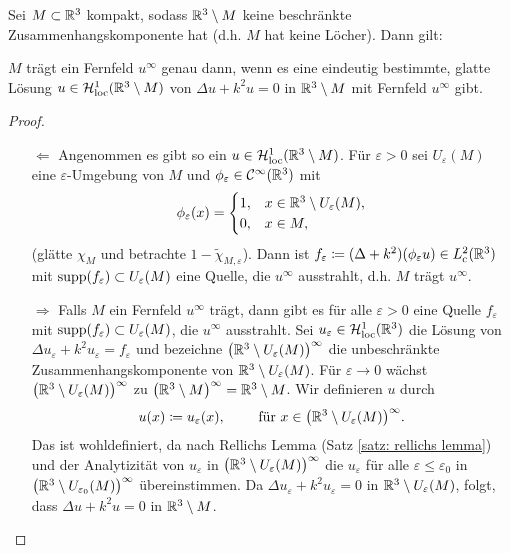 \begin{lem}\label{lem: M trägt fernfeld gdw es ex eind glatte lsg von HG in M^c}
	Sei \(M\subset\mathbb{R}^3\) kompakt, sodass \(\mathbb{R}^3\setminus M\) keine beschränkte Zusammenhangskomponente hat (d.h. \(M\) hat keine Löcher). Dann gilt:\vspace{1mm}
	
	\(M\) trägt ein Fernfeld \(u^\infty\) genau dann, wenn es eine eindeutig bestimmte, glatte Lösung \(u\in\mathcal{H}_{\mathrm{loc}}^1(\mathbb{R}^3\setminus M)\) von \(\Delta u+k^2u=0\) in \(\mathbb{R}^3\setminus M\) mit Fernfeld \(u^\infty\) gibt.
\end{lem}
\begin{proof}\
	\begin{enumerate}
		\item[\glqq{}\(\Leftarrow\)\grqq{}] Angenommen es gibt so ein \(u\in\mathcal{H}_{\mathrm{loc}}^1(\mathbb{R}^3\setminus M)\). Für \(\varepsilon>0\) sei \(U_\varepsilon(M)\) eine \(\varepsilon\)-Umgebung von \(M\) und \(\phi_\varepsilon\in\mathcal{C}^\infty(\mathbb{R}^3)\) mit 
		\begin{equation*}
			\phi_\varepsilon(x)=
			\begin{cases}
				1,&x\in\mathbb{R}^3\setminus U_\varepsilon(M),\\
				0,&x\in M,
			\end{cases}
		\end{equation*}
		(glätte \(\chi_M\) und betrachte \(1-\widetilde{\chi}_{M,\varepsilon}\)). Dann ist \(f_\varepsilon\coloneqq(\Delta+k^2)(\phi_\varepsilon u)\in L_{\mathrm{c}}^2(\mathbb{R}^3)\) mit \(\operatorname{supp}(f_\varepsilon)\subset U_\varepsilon(M)\) eine Quelle, die \(u^\infty\) ausstrahlt, d.h. \(M\) trägt \(u^\infty\).
		\item[\glqq{}\(\Rightarrow\)\grqq{}] Falls \(M\) ein Fernfeld \(u^\infty\) trägt, dann gibt es für alle \(\varepsilon>0\) eine Quelle \(f_\varepsilon\) mit \(\operatorname{supp}(f_\varepsilon)\subset U_\varepsilon(M)\), die \(u^\infty\) ausstrahlt. Sei \(u_\varepsilon\in\mathcal{H}_{\mathrm{loc}}^1(\mathbb{R}^3)\) die Lösung von \(\Delta u_\varepsilon+k^2u_\varepsilon=f_\varepsilon\) und bezeichne \(\big(\mathbb{R}^3\setminus U_\varepsilon(M)\big)^\infty\) die unbeschränkte Zusammenhangskomponente von \(\mathbb{R}^3\setminus U_\varepsilon(M)\). Für \(\varepsilon\to0\) wächst \(\big(\mathbb{R}^3\setminus U_\varepsilon(M)\big)^\infty\) zu \(\big(\mathbb{R}^3\setminus M\big)^\infty=\mathbb{R}^3\setminus M\). Wir definieren \(u\) durch
		\begin{equation*}
			u(x)\coloneqq u_\varepsilon(x),\qquad\text{ für }x\in\big(\mathbb{R}^3\setminus U_\varepsilon(M)\big)^\infty.
		\end{equation*}
		Das ist wohldefiniert, da nach Rellichs Lemma (Satz \ref{satz: rellichs lemma}) und der Analytizität von \(u_\varepsilon\) in \(\big(\mathbb{R}^3\setminus U_\varepsilon(M)\big)^\infty\) die \(u_\varepsilon\) für alle \(\varepsilon\leq \varepsilon_0\) in \(\big(\mathbb{R}^3\setminus U_{\varepsilon_0}(M)\big)^\infty\) übereinstimmen. Da \(\Delta u_\varepsilon+k^2u_\varepsilon=0\) in \(\mathbb{R}^3\setminus U_\varepsilon(M)\), folgt, dass \(\Delta u+k^2u=0\) in \(\mathbb{R}^3\setminus M\).
	\end{enumerate}
\end{proof}

